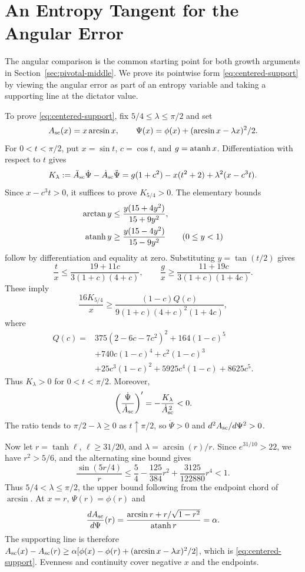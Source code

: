 \section{An Entropy Tangent for the Angular Error}
\label{app:centered-support}

The angular comparison is the common starting point for both growth
arguments in Section~\ref{sec:pivotal-middle}. We prove its pointwise
form \eqref{eq:centered-support} by viewing the angular error as part of
an entropy variable and taking a supporting line at the dictator value.

To prove \eqref{eq:centered-support}, fix
\(5/4\le\lambda\le\pi/2\) and set
\[
 A_{\rm sc}(x)=x\arcsin x,\qquad
 \Psi(x)=\phi(x)+(\arcsin x-\lambda x)^2/2.
\]
For \(0<t<\pi/2\), put \(x=\sin t\), \(c=\cos t\), and \(g=\operatorname{atanh} x\).
Differentiation with respect to \(t\) gives
\[
 K_\lambda:=\ddot A_{\rm sc}\dot\Psi-
                \dot A_{\rm sc}\ddot\Psi
 =g(1+c^2)-x(t^2+2)+\lambda^2(x-c^3t).
\]
Since \(x-c^3t>0\), it suffices to prove \(K_{5/4}>0\).
The elementary bounds
\begin{align*}
 \arctan y&\le\frac{y(15+4y^2)}{15+9y^2},\\
 \operatorname{atanh} y&\ge\frac{y(15-4y^2)}{15-9y^2}\qquad(0\le y<1)
\end{align*}
follow by differentiation and equality at zero. Substituting
\(y=\tan(t/2)\) gives
\[
 \frac tx\le\frac{19+11c}{3(1+c)(4+c)},\qquad
 \frac gx\ge\frac{11+19c}{3(1+c)(1+4c)}.
\]
These imply
\[
 \frac{16K_{5/4}}x\ge
 \frac{(1-c)Q(c)}{9(1+c)(4+c)^2(1+4c)},
\]
where
\begin{align*}
 Q(c)={}&375(2-6c-7c^2)^2+164(1-c)^5\\
 &+740c(1-c)^4+c^2(1-c)^3\\
 &+25c^3(1-c)^2+5925c^4(1-c)+8625c^5.
\end{align*}
Thus \(K_\lambda>0\) for \(0<t<\pi/2\). Moreover,
\[
 \left(\frac{\dot\Psi}{\dot A_{\rm sc}}\right)'
       =-\frac{K_\lambda}{\dot A_{\rm sc}^{\,2}}<0.
\]
The ratio tends to \(\pi/2-\lambda\ge0\) as \(t\uparrow\pi/2\),
so \(\dot\Psi>0\) and \(d^2A_{\rm sc}/d\Psi^2>0\).

Now let \(r=\tanh\ell\), \(\ell\ge31/20\), and
\(\lambda=\arcsin(r)/r\). Since \(e^{31/10}>22\), we have
\(r^2>5/6\), and the alternating sine bound gives
\[
 \frac{\sin(5r/4)}r
 \le\frac54-\frac{125}{384}r^2+\frac{3125}{122880}r^4<1.
\]
Thus \(5/4<\lambda\le\pi/2\), the upper bound following from
the endpoint chord of \(\arcsin\). At \(x=r\),
\(\Psi(r)=\phi(r)\) and
\[
 \frac{dA_{\rm sc}}{d\Psi}(r)
   =\frac{\arcsin r+r/\sqrt{1-r^2}}{\operatorname{atanh} r}
   =\alpha.
\]
The supporting line is therefore
\(A_{\rm sc}(x)-A_{\rm sc}(r)\ge
\alpha[\phi(x)-\phi(r)+(\arcsin x-\lambda x)^2/2]\),
which is \eqref{eq:centered-support}. Evenness and continuity
cover negative \(x\) and the endpoints.
